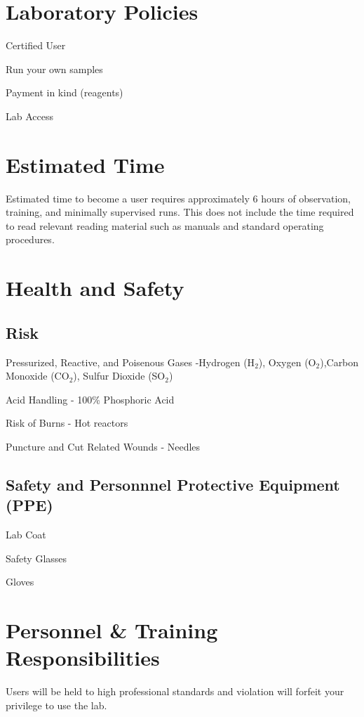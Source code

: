 \documentclass[12pt]{../SOP3_beta}\usepackage[]{graphicx}\usepackage[]{color}
\begin{document}
\section{Laboratory Policies}

\NP Certified User

\NP Run your own samples

\NP Payment in kind (reagents)

\NP Lab Access

\section{Estimated Time}

\NP Estimated time to become a user requires approximately 6 hours of observation, training, and minimally supervised runs. This does not include the time required to read relevant reading material such as manuals and standard operating procedures.

\section{Health and Safety}

\subsection{Risk}

\NP Pressurized, Reactive, and Poisenous Gases -Hydrogen (H$_2$), Oxygen (O$_2$),Carbon Monoxide (CO$_2$), Sulfur Dioxide (SO$_2$)

\NP Acid Handling - 100\% Phosphoric Acid

\NP Risk of Burns - Hot reactors

\NP Puncture and Cut Related Wounds - Needles

\subsection{Safety and Personnnel Protective Equipment (PPE)}

\NP Lab Coat

\NP Safety Glasses

\NP Gloves

\section{Personnel \& Training Responsibilities}

\NP Users will be held to high professional standards and violation will forfeit your privilege to use the lab.
\end{document}
